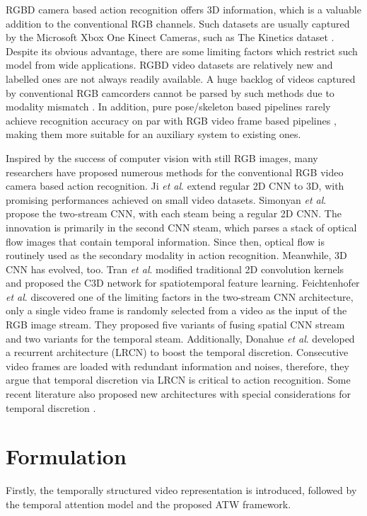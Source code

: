 \documentclass[runningheads,a4paper]{llncs}
\begin{document}
RGBD camera based action recognition offers 3D information, which is a valuable addition to the conventional RGB channels.
Such datasets are usually captured by the Microsoft Xbox One Kinect Cameras, such as The Kinetics dataset \cite{cheron2015p}.
Despite its obvious advantage, there are some limiting factors which restrict such model from wide applications. RGBD video
datasets are relatively new and labelled ones are not always readily available. A huge backlog of videos captured by
conventional RGB camcorders cannot be parsed by such methods due to modality mismatch \cite{zhang2015multi}. In addition, pure pose/skeleton based pipelines rarely achieve
recognition accuracy on par with RGB video frame based pipelines \cite{zhang2015can,zhang2015auxiliary}, making them more suitable for an auxiliary system to
existing ones.


Inspired by the success of computer vision with still RGB images, many researchers have proposed numerous methods for the
conventional RGB video camera based action recognition. Ji \textit{et al}. \cite{ji20133d} extend regular 2D CNN to 3D, with
promising performances achieved on small video datasets. Simonyan \textit{et al}. \cite{simonyan2014two} propose the two-stream
CNN, with each steam being a regular 2D CNN. The innovation is primarily in the second CNN steam, which parses a stack of optical
flow images that contain temporal information. Since then, optical flow is routinely used as the secondary modality in action
recognition. Meanwhile, 3D CNN has evolved, too. Tran \textit{et al}. \cite{tran2015learning} modified traditional 2D convolution
kernels and proposed the C3D network for spatiotemporal feature learning. Feichtenhofer \textit{et al}.
\cite{feichtenhofer2016convolutional} discovered one of the limiting factors in the two-stream CNN architecture, only a
single video frame is randomly selected from a video as the input of the RGB image stream. They proposed five variants of fusing
spatial CNN stream and two variants for the temporal steam. Additionally, Donahue \textit{et al}. \cite{donahue2015long}
developed a recurrent architecture (LRCN) to boost the temporal discretion. Consecutive video frames are loaded with redundant
information and noises, therefore, they argue that temporal discretion via LRCN is critical to action recognition. Some recent
literature also proposed new architectures with special considerations for temporal discretion
\cite{wang2016temporal,yao2015describing,gaidon2013temporal,huang2018video}.
%
%
%
\section{Formulation}%
Firstly, the temporally structured video representation is introduced, followed by the temporal attention model and the proposed ATW framework. 
%
\end{document}
